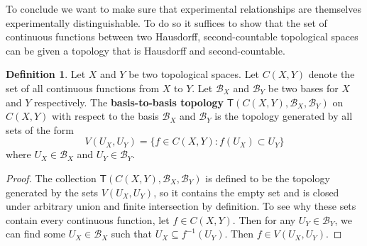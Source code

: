 \documentclass{amsart}
\theoremstyle{definition}
\newtheorem{defn}[thm]{Definition}
\numberwithin{equation}{section}
\begin{document}
To conclude we want to make sure that experimental relationships are themselves experimentally distinguishable. To do so it suffices to show that the set of continuous functions between two Hausdorff, second-countable topological spaces can be given a topology that is Hausdorff and second-countable.

\begin{defn} Let $X$ and $Y$ be two topological spaces. Let $C(X,Y)$ denote the set of all continuous functions from $X$ to $Y$. Let $\mathcal{B}_X$ and $\mathcal{B}_Y$ be two bases for $X$ and $Y$ respectively. The \textbf{basis-to-basis topology} $\mathsf{T}(C(X,Y), \mathcal{B}_X, \mathcal{B}_Y)$ on $C(X,Y)$ with respect to the basis $\mathcal{B}_X$ and $\mathcal{B}_Y$ is the topology generated by all sets of the form 
	$$
	V(U_X, U_Y) = \{f\in C(X,Y) : f(U_X)\subset U_Y\}
	$$
where $U_X \in \mathcal{B}_X$ and $U_Y \in \mathcal{B}_Y$.
\end{defn}

\begin{proof}
	The collection $\mathsf{T}(C(X,Y), \mathcal{B}_X, \mathcal{B}_Y)$ is defined to be the topology generated by the sets $V(U_X,U_Y)$, so it contains the empty set and is closed under arbitrary union and finite intersection by definition. To see why these sets contain every continuous function, let $f\in C(X,Y)$. Then for any $U_Y\in \mathcal{B}_Y$, we can find some $U_X\in \mathcal{B}_X$ such that $U_X\subseteq f^{-1}(U_Y)$. Then $f\in V(U_X,U_Y)$.
\end{proof}
\end{document}
